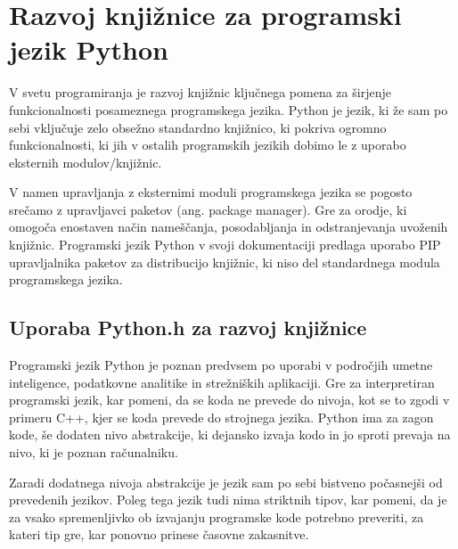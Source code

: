 \documentclass[a4paper,12pt,openright]{book}
\begin{document}
    \section{Razvoj knjižnice za programski jezik \newline Python}

    V svetu programiranja je razvoj knjižnic ključnega pomena za širjenje funkcionalnosti posameznega programskega jezika. Python je jezik, ki že sam po sebi vključuje zelo obsežno standardno knjižnico, ki pokriva ogromno funkcionalnosti, ki jih v ostalih programskih jezikih dobimo le z uporabo eksternih modulov/knjižnic.

    V namen upravljanja z eksternimi moduli programskega jezika se pogosto srečamo z upravljavci paketov (ang. package manager). Gre za orodje, ki omogoča enostaven način nameščanja, posodabljanja in odstranjevanja uvoženih knjižnic. Programski jezik Python v svoji dokumentaciji \cite{PY_PM} predlaga uporabo PIP \cite{PIP} upravljalnika paketov za distribucijo knjižnic, ki niso del standardnega modula programskega jezika.
   
    \subsection{Uporaba Python.h za razvoj knjižnice}
   Programski jezik Python je poznan predvsem po uporabi v področjih umetne inteligence, podatkovne analitike in strežniških aplikaciji. Gre za interpretiran programski jezik, kar pomeni, da se koda ne prevede do nivoja, kot se to zgodi v primeru C++, kjer se koda prevede do strojnega jezika. Python ima za zagon kode, še dodaten nivo abstrakcije, ki dejansko izvaja kodo in jo sproti prevaja na nivo, ki je poznan računalniku.

   Zaradi dodatnega nivoja abstrakcije je jezik sam po sebi bistveno počasnejši od prevedenih jezikov. Poleg tega jezik tudi nima striktnih tipov, kar pomeni, da je za vsako spremenljivko ob izvajanju programske kode potrebno preveriti, za kateri tip gre, kar ponovno prinese časovne zakasnitve.
\end{document}
